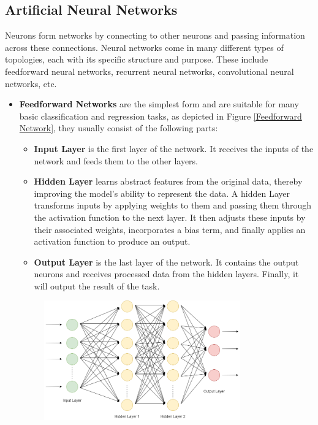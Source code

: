 \documentclass[english,version-2022-01]{uzl-thesis}
\begin{document}
\subsection{Artificial Neural Networks}Neurons form networks by connecting to other neurons and passing information across these connections. Neural networks come in many different types of topologies, each with its specific structure and purpose. These include feedforward neural networks, recurrent neural networks, convolutional neural networks, etc. 
\begin{itemize}
    \item \textbf{Feedforward Networks} are the simplest form and are suitable for many basic classification and regression tasks, as depicted in Figure \ref{Feedforward Network}, they usually consist of the following parts: 
    \begin{itemize}
    \item \textbf{Input Layer} is the first layer of the network. It receives the inputs of the network and feeds them to the other layers.
    \item \textbf{Hidden Layer} learns abstract features from the original data, thereby improving the model's ability to represent the data. A hidden Layer transforms inputs by applying weights to them and passing them through the activation function to the next layer. It then adjusts these inputs by their associated weights, incorporates a bias term, and finally applies an activation function to produce an output.
    \item \textbf{Output Layer} is the last layer of the network. It contains the output neurons and receives processed data from the hidden layers. Finally, it will output the result of the task.
    \end{itemize}
    \begin{figure}[htpb]
      \centering
      \includegraphics[width=0.8\textwidth]{pic/DNN.png}

\end{figure}
\end{itemize}
\end{document}

